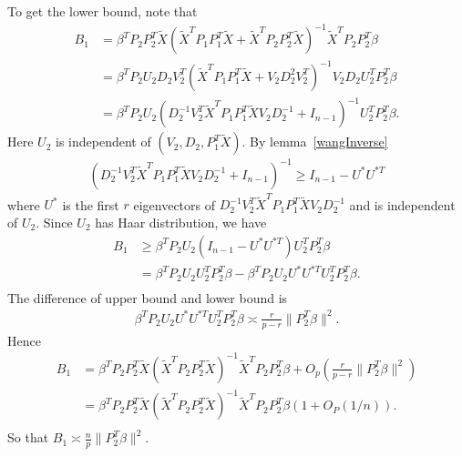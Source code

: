 \documentclass[review]{elsarticle}
\theoremstyle{plain}
\theoremstyle{definition}
\theoremstyle{remark}
\begin{document}
To get the lower bound, note that
\begin{equation}
    \begin{aligned}
        B_1&= \beta^T P_2 P_2^T \tilde{X} {(\tilde{X}^T P_1 P_1^T \tilde{X}+\tilde{X}^T P_2 P_2^T \tilde{X})}^{-1}\tilde{X}^T P_2 P_2^T \beta\\
        &= \beta^T P_2 U_2 D_2 V^T_2 {(\tilde{X}^T P_1 P_1^T \tilde{X}+V_2 D_2^2 V_2^T)}^{-1}V_2 D_2 U_2^T P_2^T \beta\\
        &= \beta^T P_2 U_2  {(D_2^{-1} V_2^T \tilde{X}^T P_1 P_1^T \tilde{X} V_2 D_2^{-1} +I_{n-1})}^{-1} U_2^T P_2^T \beta.
    \end{aligned}
\end{equation}
Here $U_2$ is independent of $(V_2,D_2,P_1^T\tilde{X})$. By lemma~\ref{wangInverse}
\begin{equation}
    \begin{aligned}
        {(D_2^{-1}V_2^T\tilde{X}^T P_1 P_1^T \tilde{X}V_2 D_2^{-1} +I_{n-1})}^{-1}\geq I_{n-1}- U^* U^{*T}
    \end{aligned}
\end{equation}
where $U^*$ is the first $r$ eigenvectors of $D_2^{-1} V_2^T \tilde{X}^T P_1 P_1^T \tilde{X}V_2 D_2^{-1}$ and is independent of $U_2$. Since $U_2$ has Haar distribution, we have
\begin{equation}\label{lowerbound}
    \begin{aligned}
        B_1&\geq \beta^T P_2 U_2 (I_{n-1}-U^* U^{*T})U_2^T P_2^T \beta\\
        &= \beta^T P_2 U_2 U_2^T P_2^T \beta-  \beta^T P_2 U_2 U^* U^{*T} U_2^T P_2^T \beta.\\
    \end{aligned}
\end{equation}
The difference of upper bound and lower bound is
\begin{equation}
    \begin{aligned}
 \beta^T P_2 U_2 U^* U^{*T}U_2^T P_2^T \beta \asymp \frac{r}{p-r}\|P_2^T \beta\|^2.
    \end{aligned}
\end{equation}
Hence 
\begin{equation}
    \begin{aligned}
        B_1&=\beta^T P_2 P_2^T \tilde{X} {(\tilde{X}^T P_2 P_2^T \tilde{X})}^{-1}\tilde{X}^T P_2 P_2^T \beta+O_p(\frac{r}{p-r}\|P_2^T \beta\|^2)\\
        &=\beta^T P_2 P_2^T \tilde{X} {(\tilde{X}^T P_2 P_2^T \tilde{X})}^{-1}\tilde{X}^T P_2 P_2^T \beta(1+O_P(1/n)).\\
    \end{aligned}
\end{equation}
So that $B_1\asymp \frac{n}{p}\|P_2^T \beta\|^2$.
\end{document}

